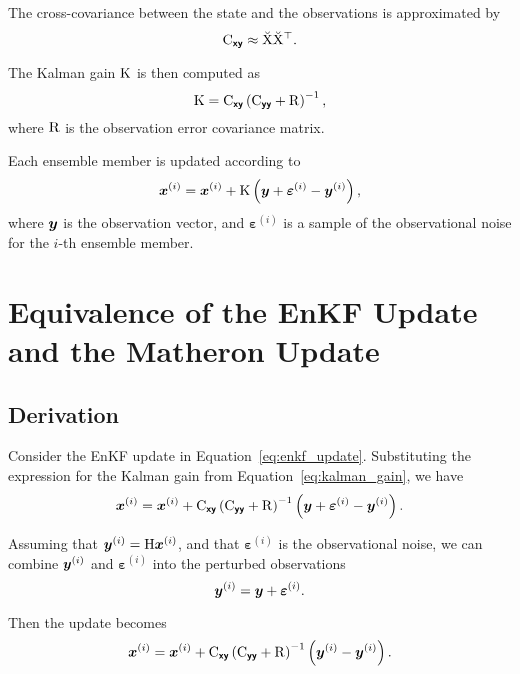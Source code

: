 \documentclass{article}
\begin{document}
The cross-covariance between the state and the observations is approximated by
\begin{equation}
    \mathrm{C}_{\boldsymbol{\mathsf{xy}}} \approx \breve{\mathrm{X}} \breve{\mathrm{X}}^\top.
\end{equation}

The Kalman gain $\mathrm{K}$ is then computed as
\begin{equation}
    \mathrm{K} = \mathrm{C}_{\boldsymbol{\mathsf{xy}}} \left( \mathrm{C}_{\boldsymbol{\mathsf{yy}}} + \mathrm{R} \right)^{-1},
    \label{eq:kalman_gain}
\end{equation}
where $\mathrm{R}$ is the observation error covariance matrix.

Each ensemble member is updated according to
\begin{equation}
    \boldsymbol{x}^{(i)} = \boldsymbol{x}^{(i)} + \mathrm{K} \left( \boldsymbol{y} + \boldsymbol{\varepsilon}^{(i)} - \boldsymbol{y}^{(i)} \right),
    \label{eq:enkf_update}
\end{equation}
where $\boldsymbol{y}$ is the observation vector, and $\boldsymbol{\varepsilon}^{(i)}$ is a sample of the observational noise for the $i$-th ensemble member.

\section{Equivalence of the EnKF Update and the Matheron Update}

\subsection{Derivation}

Consider the EnKF update in Equation~\eqref{eq:enkf_update}. Substituting the expression for the Kalman gain from Equation~\eqref{eq:kalman_gain}, we have
\begin{equation}
    \boldsymbol{x}^{(i)} = \boldsymbol{x}^{(i)} + \mathrm{C}_{\boldsymbol{\mathsf{xy}}} \left( \mathrm{C}_{\boldsymbol{\mathsf{yy}}} + \mathrm{R} \right)^{-1} \left( \boldsymbol{y} + \boldsymbol{\varepsilon}^{(i)} - \boldsymbol{y}^{(i)} \right).
    \label{eq:enkf_update_substituted}
\end{equation}

Assuming that $\boldsymbol{y}^{(i)} = \mathrm{H} \boldsymbol{x}^{(i)}$, and that $\boldsymbol{\varepsilon}^{(i)}$ is the observational noise, we can combine $\boldsymbol{y}^{(i)}$ and $\boldsymbol{\varepsilon}^{(i)}$ into the perturbed observations
\begin{equation}
    \boldsymbol{y}^{(i)} = \boldsymbol{y} + \boldsymbol{\varepsilon}^{(i)}.
\end{equation}

Then the update becomes
\begin{equation}
    \boldsymbol{x}^{(i)} = \boldsymbol{x}^{(i)} + \mathrm{C}_{\boldsymbol{\mathsf{xy}}} \left( \mathrm{C}_{\boldsymbol{\mathsf{yy}}} + \mathrm{R} \right)^{-1} \left( \boldsymbol{y}^{(i)} - \boldsymbol{y}^{(i)} \right).
    \label{eq:enkf_matheron}
\end{equation}
\end{document}
